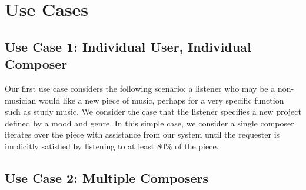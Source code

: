\documentclass[final,authoryear,5p,times,twocolumn]{elsarticle}
\begin{document}

\section{Use Cases}

\subsection{Use Case 1: Individual User, Individual Composer}

Our first use case considers the following scenario: a listener who may be a non-musician would like a new piece of music, perhaps for a very specific function such as study music. We consider the case that the listener specifies a new project defined by a mood and genre. In this simple case, we consider a single composer iterates over the piece with assistance from our system until the requester is implicitly satisfied by listening to at least 80\% of the piece.

\subsection{Use Case 2: Multiple Composers}
\end{document}
